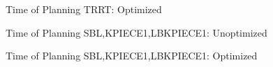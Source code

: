 \begin{figure}[!htbp] %
	\centering
	\caption{Time of Planning TRRT: Optimized}
	\label{fig:tc4}
\end{figure}
\begin{figure}[!htbp] %
	\centering
	\caption{Time of Planning SBL,KPIECE1,LBKPIECE1: Unoptimized}
	\label{fig:tc5}
\end{figure}
\begin{figure}[!htbp] %
	\centering
	\caption{Time of Planning SBL,KPIECE1,LBKPIECE1: Optimized}
	\label{fig:tc6}
\end{figure}
